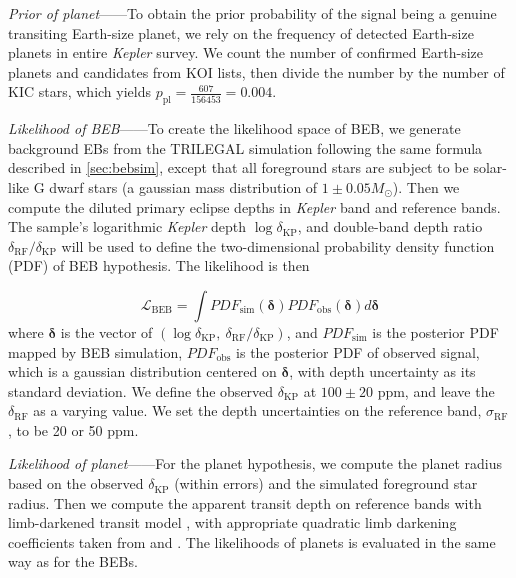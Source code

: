 \documentclass{aastex63}
\begin{document}
 \emph{Prior of planet}——To obtain the prior probability of the signal being a genuine transiting Earth-size planet, we rely on the frequency of detected Earth-size planets in entire \emph{Kepler} survey. We count the number of confirmed Earth-size planets and candidates from KOI lists, then divide the number by the number of KIC stars, which yields $p_\mathrm{pl}=\frac{607}{156453}=0.004$.

 \emph{Likelihood of BEB}——To create the likelihood space of BEB, we generate background EBs from the TRILEGAL simulation following the same formula described in \ref{sec:bebsim}, except that all foreground stars are subject to be solar-like G dwarf stars (a gaussian mass distribution of $1 \pm 0.05 M_\odot$). Then we compute the diluted primary eclipse depths in \emph{Kepler} band and reference bands. The sample's logarithmic \emph{Kepler} depth $\log \delta_\mathrm{KP}$, and double-band depth ratio $\delta_\mathrm{RF}/\delta_\mathrm{KP}$ will be used to define the two-dimensional probability density function (PDF) of BEB hypothesis. The likelihood is then
    
 \begin{equation}
 \label{eq:beb_likelihood}
    \mathcal{L}_\mathrm{BEB} = \int PDF_\mathrm{sim}(\bm{\delta}) PDF_\mathrm{obs}(\bm{\delta}) d \bm{\delta}
 \end{equation}
 where $\bm{\delta}$ is the vector of $(\log \delta_\mathrm{KP},~\delta_\mathrm{RF}/\delta_\mathrm{KP})$, and $PDF_\mathrm{sim}$ is the posterior PDF mapped by BEB simulation, $PDF_\mathrm{obs}$ is the posterior PDF of observed signal, which is a gaussian distribution centered on $\bm{\delta}$, with depth uncertainty as its standard deviation. We define the observed $\delta_\mathrm{KP}$ at $100 \pm 20$ ppm, and leave the $\delta_\mathrm{RF}$ as a varying value. We set the depth uncertainties on the reference band, $\sigma_\mathrm{RF}$, to be 20 or 50 ppm. 

 \emph{Likelihood of planet}——For the planet hypothesis, we compute the planet radius based on the observed $\delta_\mathrm{KP}$ (within errors) and the simulated foreground star radius. Then we compute the apparent transit depth on reference bands with limb-darkened transit model \citep{2002ApJ...580L.171M}, with appropriate quadratic limb darkening coefficients taken from \cite{Claret2011} and \cite{Claret2017}. The likelihoods of planets is evaluated in the same way as for the BEBs.
    
\end{document}
